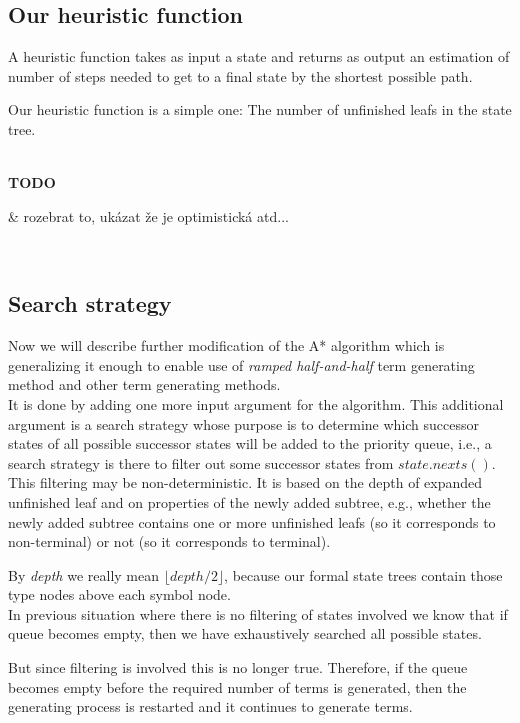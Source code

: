 \documentclass[12pt,a4paper]{report}
\newenvironment{todo}
{ ~\\[0.5em]
  {\color{red}\textbf{TODO}}
  \begin{easylist}[itemize]}
{ \end{easylist}
  ~}
\begin{document}
\subsection{Our heuristic function}

A heuristic function takes as input a state and returns as output an estimation of number
of steps needed to get to a final state by the shortest possible path.

Our heuristic function is a simple one: The number of unfinished leafs in the state tree.


\begin{todo}
& rozebrat to, ukázat že je optimistická atd...
\end{todo}

\subsection{Search strategy}

Now we will describe further modification of the A* algorithm 
which is generalizing it enough to enable use of \textit{ramped half-and-half}
term generating method and other term generating methods.\\


It is done by adding one more input argument for the algorithm.
This additional argument is a search strategy whose purpose is
to determine which successor states of all possible successor states 
will be added to the priority queue, i.e., a search strategy 
is there to filter out some successor states from $state.nexts()$.
This filtering may be non-deterministic. It is based on
the depth of expanded unfinished leaf and on properties of 
the newly added subtree, e.g., whether the newly added subtree
contains one or more unfinished leafs (so it corresponds to non-terminal) 
or not (so it corresponds to terminal). 

By \textit{depth} we really mean $\lfloor depth/2 \rfloor$, because our 
formal state trees contain those type nodes above each symbol node. 
\\


In previous situation where there is no filtering of states involved 
we know that if queue becomes empty, then we have exhaustively searched
all possible states. 

But since filtering is involved this is no longer true.
Therefore, if the queue becomes empty before the required number of
terms is generated, then the generating process is restarted and 
it continues to generate terms.
\end{document}
